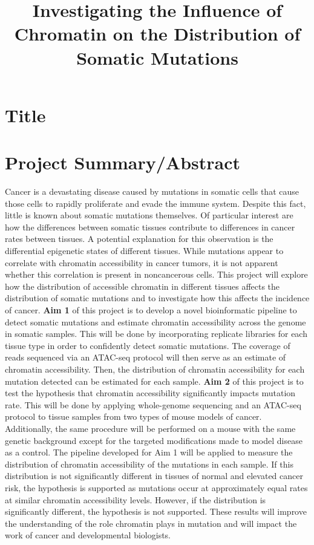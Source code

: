 \documentclass[12pt]{article}
\title{Investigating the Influence of Chromatin on the Distribution of Somatic Mutations}
\date{}
\begin{document}
\section{Title}
\maketitle

\section{Project Summary/Abstract} %

Cancer is a devastating disease caused by mutations in somatic cells that cause those cells to rapidly proliferate and evade the immune system.
Despite this fact, little is known about somatic mutations themselves.
Of particular interest are how the differences between somatic tissues contribute to differences in cancer rates between tissues.
A potential explanation for this observation is the differential epigenetic states of different tissues.
While mutations appear to correlate with chromatin accessibility in cancer tumors, it is not apparent whether this correlation is present in noncancerous cells.
This project will explore how the distribution of accessible chromatin in different tissues affects the distribution of somatic mutations and to investigate how this affects the incidence of cancer.
\textbf{Aim 1} of this project is to develop a novel bioinformatic pipeline to detect somatic mutations and estimate chromatin accessibility across the genome in somatic samples.
This will be done by incorporating replicate libraries for each tissue type in order to confidently detect somatic mutations.
The coverage of reads sequenced via an ATAC-seq protocol will then serve as an estimate of chromatin accessibility.
Then, the distribution of chromatin accessibility for each mutation detected can be estimated for each sample.
\textbf{Aim 2} of this project is to test the hypothesis that chromatin accessibility significantly impacts mutation rate.
This will be done by applying whole-genome sequencing and an ATAC-seq protocol to tissue samples from two types of mouse models of cancer.
Additionally, the same procedure will be performed on a mouse with the same genetic background except for the targeted modifications made to model disease as a control.
The pipeline developed for Aim 1 will be applied to measure the distribution of chromatin accessibility of the mutations in each sample.
If this distribution is not significantly different in tissues of normal and elevated cancer risk, the hypothesis is supported as mutations occur at approximately equal rates at similar chromatin accessibility levels.
However, if the distribution is significantly different, the hypothesis is not supported.
These results will improve the understanding of the role chromatin plays in mutation and will impact the work of cancer and developmental biologists.
\end{document}
